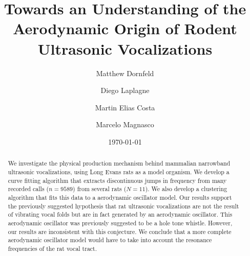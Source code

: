 \documentclass[superscriptaddress, twocolumn, prl]{revtex4}
\begin{document}
\title{Towards an Understanding of the Aerodynamic Origin of Rodent Ultrasonic Vocalizations}

\author{Matthew Dornfeld}

\author{Diego Laplagne}

\author{Martin Elias Costa} 

\author{Marcelo Magnasco}
\date{\today}
\begin{abstract}
We investigate the physical production mechanism behind mammalian narrowband ultrasonic vocalizations, using Long Evans rats as a model organism. We develop a curve fitting algorithm that extracts discontinuous jumps in frequency from many recorded calls ($n=9589$) from several rats ($N=11$). We also develop a clustering algorithm that fits this data to a aerodynamic oscillator model. Our results support the previously suggested hypothesis that rat ultrasonic vocalizations are not the result of vibrating vocal folds but are in fact generated by an aerodynamic oscillator. This aerodynamic oscillator was previously suggested to be a hole tone whistle. However, our results are inconsistent with this conjecture. We conclude that a more complete aerodynamic oscillator model would have to take into account the resonance frequencies of the rat vocal tract.   
\end{abstract}
\maketitle
\end{document}

